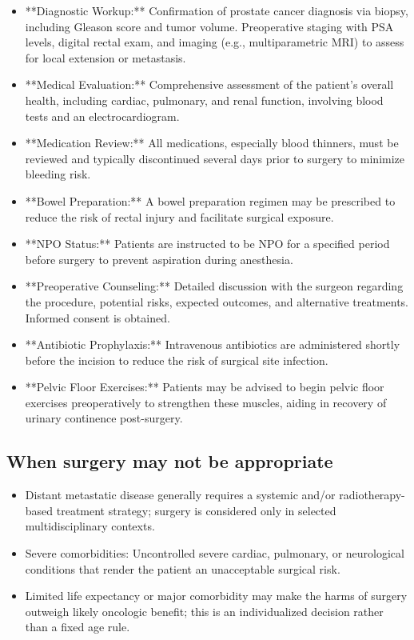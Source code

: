 \begin{itemize}
  \item **Diagnostic Workup:** Confirmation of prostate cancer diagnosis via biopsy, including Gleason score and tumor volume. Preoperative staging with PSA levels, digital rectal exam, and imaging (e.g., multiparametric MRI) to assess for local extension or metastasis.
  
  \item **Medical Evaluation:** Comprehensive assessment of the patient's overall health, including cardiac, pulmonary, and renal function, involving blood tests and an electrocardiogram.
  
  \item **Medication Review:** All medications, especially blood thinners, must be reviewed and typically discontinued several days prior to surgery to minimize bleeding risk.
  
  \item **Bowel Preparation:** A bowel preparation regimen may be prescribed to reduce the risk of rectal injury and facilitate surgical exposure.
  
  \item **NPO Status:** Patients are instructed to be NPO for a specified period before surgery to prevent aspiration during anesthesia.
  
  \item **Preoperative Counseling:** Detailed discussion with the surgeon regarding the procedure, potential risks, expected outcomes, and alternative treatments. Informed consent is obtained.
  
  \item **Antibiotic Prophylaxis:** Intravenous antibiotics are administered shortly before the incision to reduce the risk of surgical site infection.
  
  \item **Pelvic Floor Exercises:** Patients may be advised to begin pelvic floor exercises preoperatively to strengthen these muscles, aiding in recovery of urinary continence post-surgery.
\end{itemize}

\subsection*{When surgery may not be appropriate}
\begin{itemize}
  \item Distant metastatic disease generally requires a systemic and/or radiotherapy-based treatment strategy; surgery is considered only in selected multidisciplinary contexts.
  
  \item Severe comorbidities: Uncontrolled severe cardiac, pulmonary, or neurological conditions that render the patient an unacceptable surgical risk.
  
  \item Limited life expectancy or major comorbidity may make the harms of surgery outweigh likely oncologic benefit; this is an individualized decision rather than a fixed age rule.
\end{itemize}


